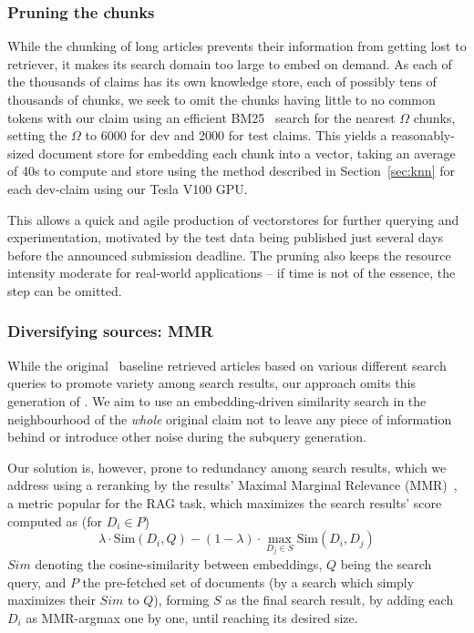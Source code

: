\subsubsection{Pruning the chunks}
While the chunking of long articles prevents their information from getting lost to retriever, it makes its search domain too large to embed on demand.
As each of the thousands of claims has its own knowledge store, each of possibly tens of thousands of chunks, we seek to omit the chunks having little to no common tokens with our claim using an efficient BM25~\cite{bm25} search for the nearest $\Omega$ chunks, setting the $\Omega$ to 6000 for dev and 2000 for test claims. 
This yields a reasonably-sized document store for embedding each chunk into a vector, taking an average of 40s to compute and store using the method described in Section~\ref{sec:knn} for each dev-claim using our Tesla V100 GPU.

This allows a quick and agile production of vectorstores for further querying and experimentation, motivated by the \averitec{}  test data being published just several days before the announced submission deadline.
The pruning also keeps the resource intensity moderate for real-world applications -- if time is not of the essence, the step can be omitted.

\subsubsection{Diversifying sources: MMR}
While the original~\cite{averitec2024} baseline retrieved articles based on various different search queries to promote variety among search results, our approach omits this generation of .
We aim to use an embedding-driven similarity search in the neighbourhood of the \textit{whole} original claim not to leave any piece of information behind or introduce other noise during the subquery generation.

Our solution is, however, prone to redundancy among search results, which we address using a reranking by the results' Maximal Marginal Relevance (MMR)~\cite{carbonell-mmr}, a metric popular for the RAG task, which maximizes the search results' score computed as (for $D_i\in P$)
$$\lambda \cdot \mathrm{Sim}(D_i, Q) - (1-\lambda) \cdot \max_{D_j \in S} \mathrm{Sim}(D_i, D_j)$$
$Sim$ denoting the cosine-similarity between embeddings, $Q$ being the search query, and $P$ the pre-fetched set of documents (by a search which simply maximizes their $Sim$ to $Q$), forming $S$ as the final search result, by adding each $D_i$ as MMR-argmax one by one, until reaching its desired size.

